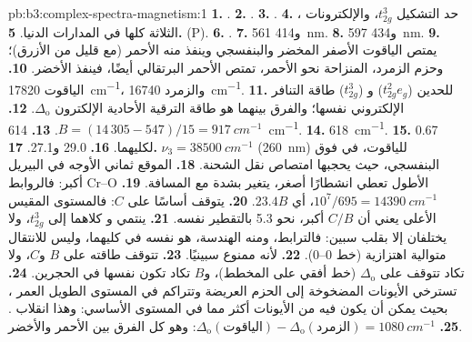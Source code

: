 \begin{solution}{pb:b3:complex-spectra-magnetism:1}
\textbf{1.} .
\textbf{2.} .
\textbf{3.} .
\textbf{4.} ، حد التشكيل $t_{2g}^3$، والإلكترونات الثلاثة كلها في المدارات الدنيا.
\textbf{5.} (P).
\textbf{6.} .
\textbf{7.} 561 و\qty{414}{nm}.
\textbf{8.} 597 و\qty{434}{nm}.
\textbf{9.} يمتص الياقوت الأصفر المخضر والبنفسجي وينفذ منه الأحمر (مع قليل من
الأزرق)؛ وحزم الزمرد، المنزاحة نحو الأحمر، تمتص الأحمر البرتقالي أيضًا، فينفذ
الأخضر.
\textbf{10.} الياقوت \qty{17820}{cm^{-1}}، والزمرد \qty{16740}{cm^{-1}}.
\textbf{11.} للحدين  ($t_{2g}^2e_g$) و ($t_{2g}^3$) طاقة التنافر الإلكتروني نفسها؛ 
والفرق بينهما هو طاقة الترقية الأحادية الإلكترون $\Delta_{\mathrm o}$.
\textbf{12.} $B = (14\,305 - 547)/15 = \qty{917}{cm^{-1}}$.
\textbf{13.} \qty{614}{cm^{-1}}.
\textbf{14.} \qty{618}{cm^{-1}}.
\textbf{15.} 0.67 لكليهما.
\textbf{16.} 29.0 و27.1.
\textbf{17.} $\nu_3 = \qty{38500}{cm^{-1}}$ (\qty{260}{nm}) للياقوت، في فوق البنفسجي، حيث يحجبها
امتصاص نقل الشحنة.
\textbf{18.} الموقع ثماني الأوجه في البيريل أكبر: فالروابط Cr--O الأطول تعطي انشطارًا
أصغر، يتغير بشدة مع المسافة.
\textbf{19.} $10^7/695 = \qty{14390}{cm^{-1}}$، أي $23.4B$.
\textbf{20.} يتوقف  أساسًا على $C$: فالمستوى المقيس الأعلى يعني أن $C/B$ أكبر،
نحو 5.3 بالتقطير نفسه.
\textbf{21.} ينتمي  و كلاهما إلى $t_{2g}^3$، ولا يختلفان إلا بقلب سبين: فالترابط،
ومنه الهندسة، هو نفسه في كليهما، وليس للانتقال متوالية
اهتزازية (خط 0--0).
\textbf{22.} لأنه ممنوع سبينيًا.
\textbf{23.} تتوقف طاقته على $B$ و$C$، ولا تكاد تتوقف على $\Delta_{\mathrm o}$ (خط أفقي على المخطط)،
و$B$ تكاد تكون نفسها في الحجرين.
\textbf{24.} تسترخي الأيونات المضخوخة إلى الحزم العريضة وتتراكم في المستوى الطويل العمر
، بحيث يمكن أن يكون فيه من الأيونات أكثر مما في المستوى الأساسي: وهذا
انقلاب .
\textbf{25.} \textbf{$\Delta_{\mathrm o}(\text{الياقوت}) - \Delta_{\mathrm o}(\text{الزمرد}) = \qty{1080}{cm^{-1}}$}: وهو كل الفرق بين الأحمر 
والأخضر.
\end{solution}
